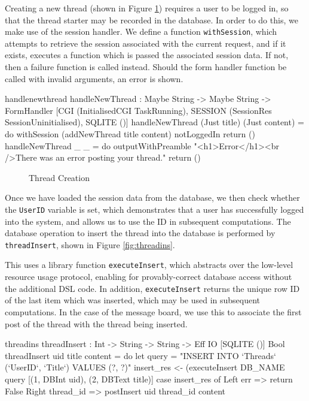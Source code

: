 \noindent
Creating a new thread (shown in Figure \ref{fig:handlethread})
requires a user to be logged in, so that the thread
starter may be recorded in the database. In order to do this, we make use of
the session handler. We define a function \texttt{withSession}, which attempts
to retrieve the session associated with the current request, and if it exists,
executes a function which is passed the associated session data. If not, then a
failure function is called instead. Should the form handler function be called
with invalid arguments, an error is shown.

\begin{SaveVerbatim}{handlenewthread}
handleNewThread : 
  Maybe String -> Maybe String -> 
  FormHandler [CGI (InitialisedCGI TaskRunning), 
               SESSION (SessionRes SessionUninitialised), 
               SQLITE ()]  
handleNewThread (Just title) (Just content) = do 
  withSession (addNewThread title content) notLoggedIn
  return ()
handleNewThread _ _ = do 
  outputWithPreamble "<h1>Error</h1><br />There was 
       an error posting your thread."
  return ()
\end{SaveVerbatim}

\begin{figure}[h]
\caption{Thread Creation}
\label{fig:handlethread}
\end{figure}

Once we have loaded the session data from the database, we then check whether
the \texttt{UserID} variable is set, which demonstrates that a user has
successfully logged into the system, and allows us to use the ID in subsequent
computations. The database operation to insert the thread into the database is
performed by \texttt{threadInsert}, shown in Figure \ref{fig:threadins}.

This uses a library function \texttt{executeInsert}, which abstracts over the
low-level resource usage protocol, enabling for provably-correct database
access without the additional DSL code. In addition, \texttt{executeInsert}
returns the unique row ID of the last item which was inserted, which may be
used in subsequent computations. In the case of the message board, we use this
to associate the first post of the thread with the thread being inserted.

\begin{SaveVerbatim}{threadins}
threadInsert : Int -> String -> String -> 
               Eff IO [SQLITE ()] Bool
threadInsert uid title content = do
  let query = "INSERT INTO `Threads` 
    (`UserID`, `Title`) VALUES (?, ?)"
  insert_res <- (executeInsert DB_NAME query 
    [(1, DBInt uid), (2, DBText title)]
  case insert_res of
    Left err => return False
    Right thread_id => postInsert uid thread_id content
\end{SaveVerbatim}

